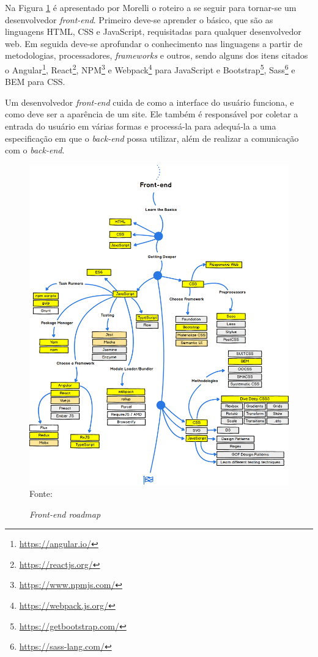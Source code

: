 \documentclass[
	12pt,				%
	openright,			%
	twoside,			%
	a4paper,			%
	english,			%
	brazil				%
	]{abntex2}
\begin{document}
Na Figura \ref{fig:FrontendRoadmap} é apresentado por Morelli\cite{morelli_roadmap} o roteiro a se seguir para tornar-se um desenvolvedor \textit{front-end}. Primeiro deve-se aprender o básico, que são as linguagens HTML, CSS e JavaScript, requisitadas para qualquer desenvolvedor web. Em seguida deve-se aprofundar o conhecimento nas linguagens a partir de metodologias, processadores, \textit{frameworks} e outros, sendo alguns dos itens citados o Angular\footnote{\url{https://angular.io/}}, React\footnote{\url{https://reactjs.org/}}, NPM\footnote{\url{https://www.npmjs.com/}} e Webpack\footnote{\url{https://webpack.js.org/}} para JavaScript e Bootstrap\footnote{\url{https://getbootstrap.com/}}, Sass\footnote{\url{https://sass-lang.com/}} e BEM para CSS.

Um desenvolvedor \textit{front-end} cuida de como a interface do usuário funciona, e como deve ser a aparência de um site. Ele também é responsável por coletar a entrada do usuário em várias formas e processá-la para adequá-la a uma especificação em que o \textit{back-end} possa utilizar, além de realizar a comunicação com o \textit{back-end}.

\begin{figure}[h!]
	\centering

	\caption{\textit{Front-end roadmap}} \label{fig:FrontendRoadmap}
    \includegraphics[scale=0.36]{frontend-roadmap} \\
    Fonte: {\cite{morelli_roadmap}}

\end{figure}
\end{document}
